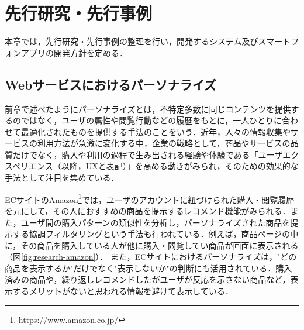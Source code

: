 \documentclass[a4paper]{jsarticle}
\begin{document}
\section{先行研究・先行事例}
本章では，先行研究・先行事例の整理を行い，開発するシステム及びスマートフォンアプリの開発方針を定める．

\subsection{Webサービスにおけるパーソナライズ}
前章で述べたようにパーソナライズとは，不特定多数に同じコンテンツを提供するのではなく，ユーザの属性や閲覧行動などの履歴をもとに，一人ひとりに合わせて最適化されたものを提供する手法のことをいう．近年，人々の情報収集やサービスの利用方法が急激に変化する中，企業の戦略として，商品やサービスの品質だけでなく，購入や利用の過程で生み出される経験や体験である「ユーザエクスペリエンス（以降，UXと表記）」を高める動きがみられ，そのための効果的な手法として注目を集めている\cite{izumi}．



ECサイトのAmazon\footnote{https://www.amazon.co.jp/}では，ユーザのアカウントに紐づけられた購入・閲覧履歴を元にして，その人におすすめの商品を提示するレコメンド機能がみられる．また，ユーザ間の購入パターンの類似性を分析し，パーソナライズされた商品を提示する協調フィルタリングという手法も行われている．例えば，商品ページの中に，その商品を購入している人が他に購入・閲覧してい商品が画面に表示される（図\ref{fig:research-amazon}）．
また，ECサイトにおけるパーソナライズは，"どの商品を表示するか"だけでなく"表示しないか"の判断にも活用されている．購入済みの商品や，繰り返しレコメンドしたがユーザが反応を示さない商品など，表示するメリットがないと思われる情報を避けて表示している．
\end{document}
